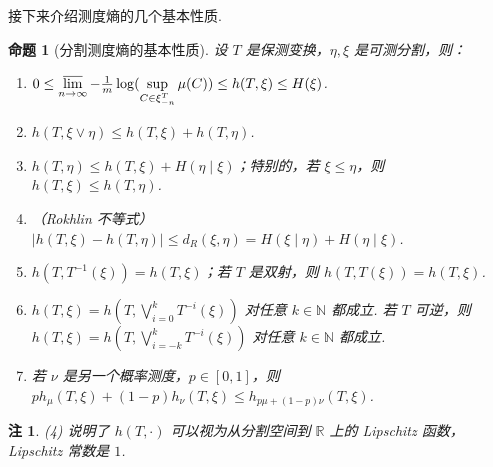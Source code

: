 \documentclass[11pt, a4paper, oneside]{ctexart}
\newtheorem{proposition}[theorem]{命题}
\newtheorem{remark}[theorem]{注}
\newcommand{\N}{\mathbb{N}}
\newcommand{\R}{\mathbb{R}}
\newcommand{\abs}[1]{\left|{#1}\right|}
\begin{document}
    接下来介绍测度熵的几个基本性质.
    \begin{proposition}[分割测度熵的基本性质]\label{命题分割测度熵的基本性质}
        设 $T$ 是保测变换，$\eta,\xi$ 是可测分割，则：
        \begin{enumerate}[(1)]
            \item $0\leq \varlimsup\limits_{n\to\infty}-\frac{1}{m}\log(\sup\limits_{C\in \xi_{-n}^T}\mu(C))\leq h(T,\xi)\leq H(\xi)$.
            \item $h(T,\xi\vee \eta)\leq h(T,\xi)+h(T,\eta)$.
            \item $h(T,\eta)\leq h(T,\xi)+H(\eta\mid \xi)$；特别的，若 $\xi\leq \eta$，则 $h(T,\xi)\leq h(T,\eta)$.
            \item （Rokhlin 不等式）$\abs{h(T,\xi)-h(T,\eta)}\leq d_R(\xi,\eta)=H(\xi\mid \eta)+H(\eta\mid \xi)$.
            \item $h(T,T^{-1}(\xi))=h(T,\xi)$；若 $T$ 是双射，则 $h(T,T(\xi))=h(T,\xi)$.
            \item $h(T,\xi)=h(T,\bigvee\limits_{i=0}^{k}T^{-i}(\xi))$ 对任意 $k\in\N$ 都成立. 若 $T$ 可逆，则 $h(T,\xi)=h(T,\bigvee\limits_{i=-k}^{k}T^{-i}(\xi))$ 对任意 $k\in\N$ 都成立.
            \item 若 $\nu$ 是另一个概率测度，$p\in [0,1]$，则 $ph_{\mu}(T,\xi)+(1-p)h_{\nu}(T,\xi)\leq h_{p\mu+(1-p)\nu}(T,\xi)$.
        \end{enumerate}
    \end{proposition}
    \begin{remark}
        (4) 说明了 $h(T,\cdot)$ 可以视为从分割空间到 $\R$ 上的 Lipschitz 函数，Lipschitz 常数是 $1$.
    \end{remark}
\end{document}
